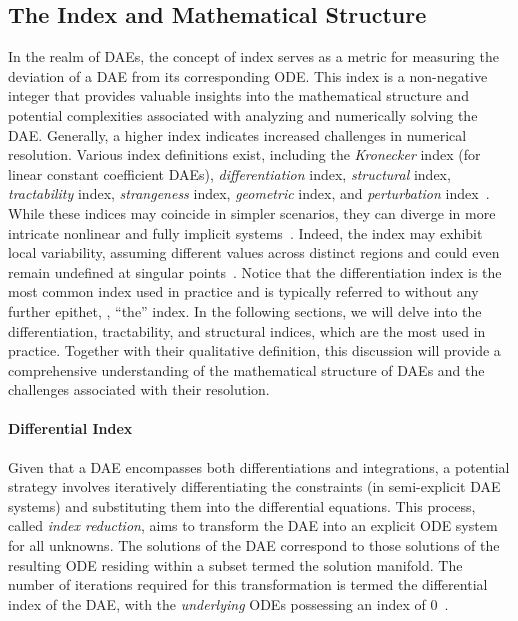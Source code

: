 \subsection{The Index and Mathematical Structure}

In the realm of \acp{DAE}, the concept of index serves as a metric for measuring the deviation of a \ac{DAE} from its corresponding \ac{ODE}. This index is a non-negative integer that provides valuable insights into the mathematical structure and potential complexities associated with analyzing and numerically solving the \ac{DAE}. Generally, a higher index indicates increased challenges in numerical resolution. Various index definitions exist, including the \emph{Kronecker} index (for linear constant coefficient \acp{DAE}), \emph{differentiation} index, \emph{structural} index, \emph{tractability} index, \emph{strangeness} index, \emph{geometric} index, and \emph{perturbation} index~\cite{mehrmann2015index}. While these indices may coincide in simpler scenarios, they can diverge in more intricate nonlinear and fully implicit systems~\cite{lamour2012detecting}. Indeed, the index may exhibit local variability, assuming different values across distinct regions and could even remain undefined at singular points~\cite{lamour2012detecting}. Notice that the differentiation index is the most common index used in practice and is typically referred to without any further epithet, \ie{}, ``the'' index. In the following sections, we will delve into the differentiation, tractability, and structural indices, which are the most used in practice. Together with their qualitative definition, this discussion will provide a comprehensive understanding of the mathematical structure of \acp{DAE} and the challenges associated with their resolution.

\paragraph{Differential Index}

Given that a \ac{DAE} encompasses both differentiations and integrations, a potential strategy involves iteratively differentiating the constraints (in semi-explicit \ac{DAE} systems) and substituting them into the differential equations. This process, called \emph{index reduction}, aims to transform the \ac{DAE} into an explicit \ac{ODE} system for all unknowns. The solutions of the \ac{DAE} correspond to those solutions of the resulting \ac{ODE} residing within a subset termed the solution manifold. The number of iterations required for this transformation is termed the differential index of the \ac{DAE}, with the \emph{underlying} \acp{ODE} possessing an index of 0~\cite{mehrmann2015index}.

